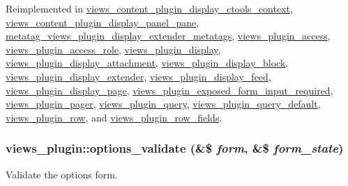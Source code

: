 Reimplemented in \hyperlink{classviews__content__plugin__display__ctools__context_a8fa3f9293bec2891e2e87249ad748c67}{views\_\-content\_\-plugin\_\-display\_\-ctools\_\-context}, \hyperlink{classviews__content__plugin__display__panel__pane_a5ee46f64275ee0fe1865b98f1b7811bf}{views\_\-content\_\-plugin\_\-display\_\-panel\_\-pane}, \hyperlink{classmetatag__views__plugin__display__extender__metatags_a7485da0c4d0a0b1bab8e2df1fceca06b}{metatag\_\-views\_\-plugin\_\-display\_\-extender\_\-metatags}, \hyperlink{classviews__plugin__access_ad0610dfaa0e225c5d2cd85c7a13287fd}{views\_\-plugin\_\-access}, \hyperlink{classviews__plugin__access__role_ad9bf6eddd91a7c224fb813a58077ee4d}{views\_\-plugin\_\-access\_\-role}, \hyperlink{classviews__plugin__display_a75f0b2d5587b365640fcb4d414daae36}{views\_\-plugin\_\-display}, \hyperlink{classviews__plugin__display__attachment_a63219dfd2bfed59bdf1840d704d11799}{views\_\-plugin\_\-display\_\-attachment}, \hyperlink{classviews__plugin__display__block_aaac31f678cc192896bcfdeb1a8a5a2c7}{views\_\-plugin\_\-display\_\-block}, \hyperlink{classviews__plugin__display__extender_a30f3b8a5bd28012f09b9e5dbb4a2a083}{views\_\-plugin\_\-display\_\-extender}, \hyperlink{classviews__plugin__display__feed_ab7cca15934456ddb26045f03483899fb}{views\_\-plugin\_\-display\_\-feed}, \hyperlink{classviews__plugin__display__page_a9b03d35a15fcfcae4a474ea56b6ca5b6}{views\_\-plugin\_\-display\_\-page}, \hyperlink{classviews__plugin__exposed__form__input__required_a579ab00684c29214329155a4a4de02c2}{views\_\-plugin\_\-exposed\_\-form\_\-input\_\-required}, \hyperlink{classviews__plugin__pager_a4e0e01490e6854df429e0136b236073b}{views\_\-plugin\_\-pager}, \hyperlink{classviews__plugin__query_adf4a74ae9fba5fbbc9a742b5b4947437}{views\_\-plugin\_\-query}, \hyperlink{classviews__plugin__query__default_aac79abee5640db26687e1794097e0798}{views\_\-plugin\_\-query\_\-default}, \hyperlink{classviews__plugin__row_adce2d15d7f422a48477c6fdf43de80ee}{views\_\-plugin\_\-row}, and \hyperlink{classviews__plugin__row__fields_ab9bddfa302a7098aad70693840bbbb6e}{views\_\-plugin\_\-row\_\-fields}.\hypertarget{classviews__plugin_a46d72eb35feea36fed83cd1355a47431}{
\subsubsection[{options\_\-validate}]{\setlength{\rightskip}{0pt plus 5cm}views\_\-plugin::options\_\-validate (\&\$ {\em form}, \/  \&\$ {\em form\_\-state})}}
\label{classviews__plugin_a46d72eb35feea36fed83cd1355a47431}
Validate the options form. 

